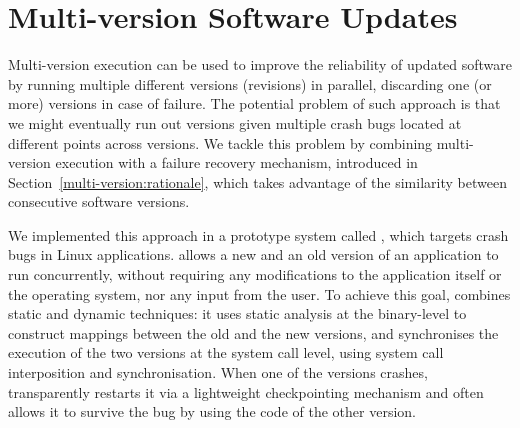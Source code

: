 \chapter{Multi-version Software Updates}
\label{chap:safe-updates}



Multi-version execution can be used to improve the reliability of updated
software by running multiple different versions (revisions) in parallel,
discarding one (or more) versions in case of failure. The potential problem of
such approach is that we might eventually run out versions given multiple crash
bugs located at different points across versions. We tackle this problem by
combining multi-version execution with a failure recovery mechanism, introduced
in Section~\ref{multi-version:rationale}, which takes advantage of the
similarity between consecutive software versions.


We implemented this approach in a prototype system called \mx, which
targets crash bugs in Linux applications.
\mx allows a new and an old version of an application to
run concurrently, without requiring any
modifications to the application itself or the operating system, nor any
input from the user. To achieve this goal, \mx combines static and
dynamic techniques: it uses static analysis at the binary-level to
construct mappings between the old and the new versions, and synchronises the
execution of the two versions at the system call level, using system call
interposition and synchronisation.  When one of the versions crashes, \mx
transparently restarts it via a lightweight checkpointing mechanism and often
allows it to survive the bug by using the code of the other version.

